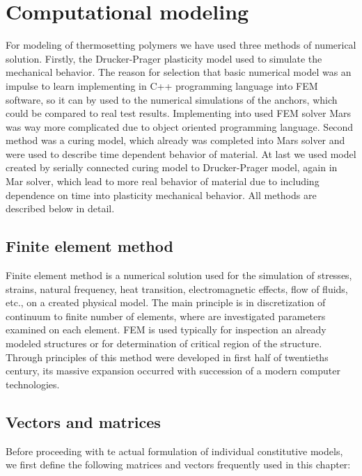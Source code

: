 \section{Computational modeling}
\indent

For modeling of thermosetting polymers we have used three methods of numerical solution. Firstly, the Drucker-Prager plasticity model used to simulate the mechanical behavior. The reason for selection that basic numerical model was an impulse to learn implementing in C++ programming language into FEM software, so it can by used to the numerical simulations of the anchors, which could be compared to real test results. Implementing into used FEM solver Mars \cite{mars} was way more complicated due to object oriented programming language. Second method was a curing model, which already was completed into Mars solver and were used to describe time dependent behavior of material. At last we used model created by serially connected curing model to Drucker-Prager model, again in Mar solver, which lead to more real behavior of material due to including dependence on time into plasticity mechanical behavior. All methods are described below in detail.

\subsection{Finite element method}
\indent

Finite element method is a numerical solution used for the simulation of stresses, strains, natural frequency, heat transition, electromagnetic effects, flow of fluids, etc., on a created physical model. The main principle is in discretization of continuum to finite number of elements, where are investigated parameters examined on each element. FEM is used typically for inspection an already modeled structures or for determination of critical region of the structure. Through principles of this method were developed in first half of twentieths century, its massive expansion occurred with succession of a modern computer technologies. 
\newpage
\subsection{Vectors and matrices}
\indent

Before proceeding with te actual formulation of individual constitutive models, we first define the following matrices and vectors frequently used in this chapter:

